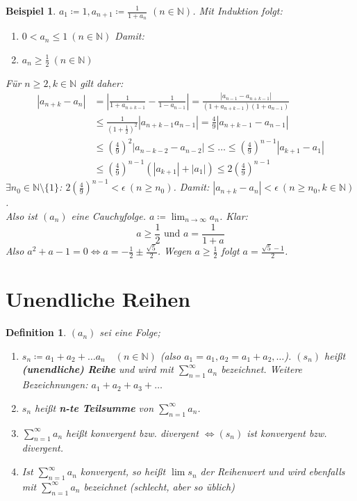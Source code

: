 \documentclass[14pt,titlepage,ngerman,a4paper,headsepline,DIV15,halfparskip*]{scrartcl}
\newcommand{\N}{\mathbb{N}}
\theoremstyle{named}
\theoremstyle{dotless}
\newtheorem*{beispiel*}{Beispiel}
\newtheorem*{definition}{Definition}
\begin{document}
\begin{beispiel*}
	$a_{1} \coloneqq 1, a_{n+1} \coloneqq \frac{1}{1 + a_{n}}$ $(n \in \N)$. Mit Induktion folgt:
	\begin{enumerate}
		\item[1)] $0 < a_{n} \leq 1 ~(n \in \N)$ Damit:
		\item[2)] $a_{n} \geq \frac{1}{2} ~(n \in \N)$
	\end{enumerate}
	Für $n \geq 2, k \in \N$ gilt daher:
	\begin{align*}
		|a_{n+k} - a_{n} | & = \left| \frac{1}{1+a_{n+k-1}} - \frac{1}{1 - a_{n - 1}} \right| = \frac{|a_{n-1} - a_{n +k-1}|}{(1+a_{n+k-1})(1+a_{n-1})} \\
			& \leq \frac{1}{(1+\frac{1}{2})^{2}} |a_{n+k-1} a_{n-1}| = \frac{4}{9} |a_{n+k-1} - a_{n-1}| \\
			& \leq \left(\frac{4}{9} \right)^{2} |a_{n-k-2} - a_{n-2}| \leq \dotsc \leq \left( \frac{4}{9} \right)^{n-1} |a_{k+1} - a_{1}| \\
			& \leq \left( \frac{4}{9} \right)^{n-1} \left( |a_{k+1}| + |a_{1}|\right) \leq 2 \left( \frac{4}{9} \right)^{n-1} 
	\end{align*}
	$\exists n_{0} \in \N \setminus \{ 1 \}$: $2\left(\frac{4}{9}\right)^{n-1} < \epsilon ~(n \geq n_{0})$. Damit: $|a_{n+k} - a_{n}| < \epsilon ~(n \geq n_{0}, k \in \N)$. \\
	Also ist $(a_{n})$ eine Cauchyfolge. $a \coloneqq \lim_{n \rightarrow \infty} a_{n}$. Klar: 
	$$ a \geq \frac{1}{2} \text{ und } a = \frac{1}{1 + a} $$
	Also $a^{2} + a - 1 = 0 \iff a = - \frac{1}{2} \pm \frac{\sqrt{5}}{2}$. Wegen $a \geq \frac{1}{2}$ folgt $a = \frac{\sqrt{5} - 1}{2}$.
\end{beispiel*}


\newpage


\section{Unendliche Reihen}


    
\begin{definition} $(a_{n})$ sei eine Folge;
	\begin{enumerate}
		\item $ s_{n} \coloneqq a_{1} + a_{2} + \dotsc a_{n} \quad (n \in \N)$
		(also $a_{1} = a_{1}, a_{2} = a_{1} + a_{2}, \dotsc$). $(s_{n})$ hei{\ss}t \textbf{(unendliche) Reihe} und wird mit $\sum_{n = 1}^{\infty} a_{n}$ bezeichnet. Weitere Bezeichnungen: $a_{1} + a_{2} + a_{3} + \dotsc$
		\item $s_{n}$ hei{\ss}t \textbf{n-te Teilsumme} von $\sum_{n=1}^{\infty} a_{n}$.	
		\item $\sum_{n=1}^{\infty} a_{n}$ hei{\ss}t konvergent bzw. divergent $\iff (s_{n})$ ist konvergent 	bzw. divergent.
		\item Ist $\sum_{n = 1}^{\infty} a_{n}$ konvergent, so hei{\ss}t $\lim s_{n}$ der Reihenwert und wird ebenfalls mit $\sum_{n=1}^{\infty} a_{n}$ bezeichnet (schlecht, aber so üblich)
	\end{enumerate} 	
\end{definition}
\end{document}
